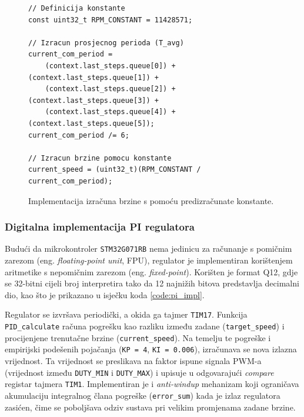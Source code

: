 \documentclass[diplomskirad]{fer}
\begin{document}
\begin{figure}[h!]
	\begin{verbatim}
// Definicija konstante
const uint32_t RPM_CONSTANT = 11428571;

// Izracun prosjecnog perioda (T_avg)
current_com_period =
    (context.last_steps.queue[0]) + (context.last_steps.queue[1]) +
    (context.last_steps.queue[2]) + (context.last_steps.queue[3]) +
    (context.last_steps.queue[4]) + (context.last_steps.queue[5]);
current_com_period /= 6;

// Izracun brzine pomocu konstante
current_speed = (uint32_t)(RPM_CONSTANT / current_com_period);
\end{verbatim}
	\caption{Implementacija izračuna brzine s pomoću predizračunate konstante.}
	\label{code:rpm_constant}
\end{figure}

\subsubsection{Digitalna implementacija PI regulatora}
\label{sssec:pi_regulator}

Budući da mikrokontroler \texttt{STM32G071RB} nema jedinicu za računanje s
pomičnim zarezom (eng. \textit{floating-point unit}, FPU), regulator je
implementiran korištenjem aritmetike s nepomičnim zarezom (eng.
\textit{fixed-point}). Korišten je format Q12, gdje se 32-bitni cijeli broj
interpretira tako da 12 najnižih bitova predstavlja decimalni dio, kao što je
prikazano u isječku koda \ref{code:pi_impl}.

Regulator se izvršava periodički, a okida ga tajmer \texttt{TIM17}. Funkcija
\texttt{PID\_calculate} računa pogrešku kao razliku između zadane
(\texttt{target\_speed}) i procijenjene trenutačne brzine
(\texttt{current\_speed}). Na temelju te pogreške i empirijski podešenih
pojačanja (\texttt{KP = 4}, \texttt{KI = 0.006}), izračunava se nova izlazna
vrijednost. Ta vrijednost se preslikava na faktor ispune signala PWM-a
(vrijednost između \texttt{DUTY\_MIN} i \texttt{DUTY\_MAX}) i upisuje u
odgovarajući \textit{compare} registar tajmera \texttt{TIM1}. Implementiran je
i \textit{anti-windup} mehanizam koji ograničava akumulaciju integralnog člana
pogreške (\texttt{error\_sum}) kada je izlaz regulatora zasićen, čime se
poboljšava odziv sustava pri velikim promjenama zadane brzine.
\end{document}
